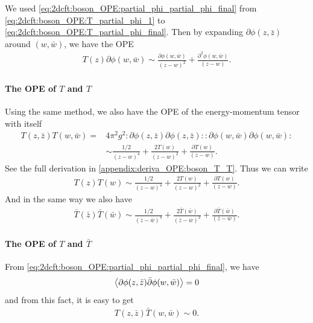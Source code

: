 \documentclass[10pt]{article}
\begin{document}
We used \cref{eq:2dcft:boson_OPE:partial_phi_partial_phi_final} from \cref{eq:2dcft:boson_OPE:T_partial_phi_1} to \cref{eq:2dcft:boson_OPE:T_partial_phi_final}.
Then by expanding $\partial\phi(z,\bar{z})$ around $(w,\bar{w})$, we have the OPE
\begin{align}
    T(z)\partial\phi(w,\bar{w})\sim\frac{\partial\phi(w,\bar{w})}{(z-w)^2}+\frac{\partial^2\phi(w,\bar{w})}{(z-w)}.
\end{align}
\paragraph{The OPE of $T$ and $T$}
Using the same method, we also have the OPE of the energy-momentum tensor with itself
\begin{subequations}
    \begin{align}
        T(z,\bar{z})T(w,\bar{w})= & 4\pi^2 g^2:\partial\phi(z,\bar{z})\partial\phi(z,\bar{z})::\partial\phi(w,\bar{w})\partial\phi(w,\bar{w}):\label{eq:2dcft:boson_OPE:T_T_1} \\
                                  & \sim\frac{1/2}{(z-w)^4}+\frac{2T(w)}{(z-w)^2}+\frac{\partial T(w)}{(z-w)}.\label{eq:2dcft:boson_OPE:T_T_final}
    \end{align}
\end{subequations}
See the full derivation in \cref{appendix:deriva_OPE:boson_T_T}.
Thus we can write
\begin{align}
    T(z)T(w)\sim\frac{1/2}{(z-w)^4}+\frac{2T(w)}{(z-w)^2}+\frac{\partial T(w)}{(z-w)}.
\end{align}
And in the same way we also have
\begin{align}
    \bar{T}(\bar{z})\bar{T}(\bar{w})\sim\frac{1/2}{(\bar{z}-\bar{w})^4}+\frac{2\bar{T}(\bar{w})}{(\bar{z}-\bar{w})^2}+\frac{\partial \bar{T}(\bar{w})}{(\bar{z}-\bar{w})}.
\end{align}
\paragraph{The OPE of $T$ and $\bar{T}$}
From \cref{eq:2dcft:boson_OPE:partial_phi_partial_phi_final}, we have
\begin{align}
    \expval{\partial\phi(z,\bar{z})\bar{\partial}\phi(w,\bar{w})}=0
\end{align}
and from this fact, it is easy to get
\begin{align}
    T(z,\bar{z})\bar{T}(w,\bar{w})\sim0.
\end{align}
\end{document}

